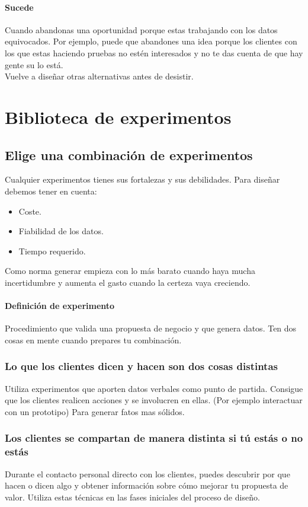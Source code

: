 \documentclass[11pt]{book}
\begin{document}
\paragraph{Sucede} Cuando abandonas una oportunidad porque estas trabajando con los datos equivocados. Por ejemplo, puede que abandones una idea porque los clientes con los que estas haciendo pruebas no estén interesados y no te das cuenta de que hay gente su lo está.
\\ Vuelve a diseñar otras alternativas antes de desistir.
\section{Biblioteca de experimentos}
\subsection{Elige una combinación de experimentos}
Cualquier experimentos tienes sus fortalezas y sus debilidades.
Para diseñar debemos tener en cuenta:
\begin{itemize}
\item Coste.
\item Fiabilidad de los datos.
\item Tiempo requerido.
\end{itemize}
Como norma generar empieza con lo más barato cuando haya mucha incertidumbre y aumenta el gasto cuando la certeza vaya creciendo.
\paragraph{Definición de experimento}
Procedimiento que valida una propuesta de negocio y que genera datos.
Ten dos cosas en mente cuando prepares tu combinación.
\subsubsection{Lo que los clientes dicen y hacen son dos cosas distintas}
Utiliza experimentos que aporten datos verbales como punto de partida. Consigue que los clientes realicen acciones y se involucren en ellas. (Por ejemplo interactuar con un prototipo) Para generar fatos mas sólidos.
\subsubsection{Los clientes se compartan de manera distinta si tú estás o no estás}
Durante el contacto personal directo con los clientes, puedes descubrir por que hacen o dicen algo y obtener información sobre cómo mejorar tu propuesta de valor. 
Utiliza estas técnicas en las fases iniciales del proceso de diseño. 
\end{document}
